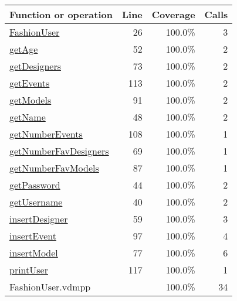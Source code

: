 \begin{longtable}{|l|r|r|r|}
\hline
Function or operation & Line & Coverage & Calls \\
\hline
\hline
\hyperref[FashionUser:26]{FashionUser} & 26&100.0\% & 3 \\
\hline
\hyperref[getAge:52]{getAge} & 52&100.0\% & 2 \\
\hline
\hyperref[getDesigners:73]{getDesigners} & 73&100.0\% & 2 \\
\hline
\hyperref[getEvents:113]{getEvents} & 113&100.0\% & 2 \\
\hline
\hyperref[getModels:91]{getModels} & 91&100.0\% & 2 \\
\hline
\hyperref[getName:48]{getName} & 48&100.0\% & 2 \\
\hline
\hyperref[getNumberEvents:108]{getNumberEvents} & 108&100.0\% & 1 \\
\hline
\hyperref[getNumberFavDesigners:69]{getNumberFavDesigners} & 69&100.0\% & 1 \\
\hline
\hyperref[getNumberFavModels:87]{getNumberFavModels} & 87&100.0\% & 1 \\
\hline
\hyperref[getPassword:44]{getPassword} & 44&100.0\% & 2 \\
\hline
\hyperref[getUsername:40]{getUsername} & 40&100.0\% & 2 \\
\hline
\hyperref[insertDesigner:59]{insertDesigner} & 59&100.0\% & 3 \\
\hline
\hyperref[insertEvent:97]{insertEvent} & 97&100.0\% & 4 \\
\hline
\hyperref[insertModel:77]{insertModel} & 77&100.0\% & 6 \\
\hline
\hyperref[printUser:117]{printUser} & 117&100.0\% & 1 \\
\hline
\hline
FashionUser.vdmpp & & 100.0\% & 34 \\
\hline
\end{longtable}


